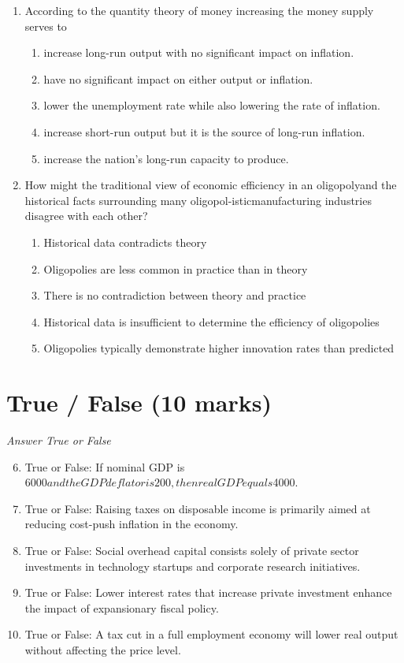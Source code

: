 \documentclass[12pt]{article}
\begin{document}
\begin{enumerate}[label=\arabic*.]
\begin{enumerate}[label=(\alph*)]
\end{enumerate}
\item According to the quantity theory of money increasing the money supply serves to
\begin{enumerate}[label=(\alph*)]
    \item increase long-run output with no significant impact on inflation.
    \item have no significant impact on either output or inflation.
    \item lower the unemployment rate while also lowering the rate of inflation.
    \item increase short-run output but it is the source of long-run inflation.
    \item increase the nation's long-run capacity to produce.
\end{enumerate}
\item How might the traditional view of economic efficiency in an oligopolyand the historical facts surrounding many oligopol-isticmanufacturing industries disagree with each other?
\begin{enumerate}[label=(\alph*)]
    \item Historical data contradicts theory
    \item Oligopolies are less common in practice than in theory
    \item There is no contradiction between theory and practice
    \item Historical data is insufficient to determine the efficiency of oligopolies
    \item Oligopolies typically demonstrate higher innovation rates than predicted
\end{enumerate}
\end{enumerate}

\section*{True / False (10 marks)}
\textit{Answer True or False}
\begin{enumerate}[label=\arabic*.]
\setcounter{enumi}{5}
\item True or False: If nominal GDP is $6000 and the GDP deflator is 200, then real GDP equals $4000.
\item True or False: Raising taxes on disposable income is primarily aimed at reducing cost-push inflation in the economy.
\item True or False: Social overhead capital consists solely of private sector investments in technology startups and corporate research initiatives.
\item True or False: Lower interest rates that increase private investment enhance the impact of expansionary fiscal policy.
\item True or False: A tax cut in a full employment economy will lower real output without affecting the price level.
\end{enumerate}
\end{document}
